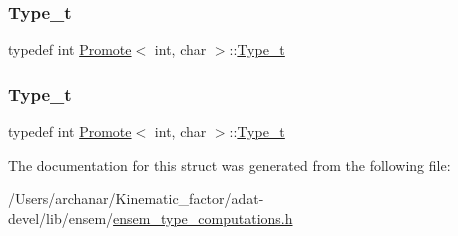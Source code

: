 \subsubsection{\texorpdfstring{Type\_t}{Type\_t}\hspace{0.1cm}{\footnotesize\ttfamily [2/3]}}
{\footnotesize\ttfamily typedef int \mbox{\hyperlink{structPromote}{Promote}}$<$ int, char $>$\+::\mbox{\hyperlink{structPromote_3_01int_00_01char_01_4_a0e318e07696fbce55dd03513e6452a2c}{Type\+\_\+t}}}

\mbox{\label{structPromote_3_01int_00_01char_01_4_a0e318e07696fbce55dd03513e6452a2c}} 
\subsubsection{\texorpdfstring{Type\_t}{Type\_t}\hspace{0.1cm}{\footnotesize\ttfamily [3/3]}}
{\footnotesize\ttfamily typedef int \mbox{\hyperlink{structPromote}{Promote}}$<$ int, char $>$\+::\mbox{\hyperlink{structPromote_3_01int_00_01char_01_4_a0e318e07696fbce55dd03513e6452a2c}{Type\+\_\+t}}}



The documentation for this struct was generated from the following file\+:\begin{DoxyCompactItemize}
\item 
/\+Users/archanar/\+Kinematic\+\_\+factor/adat-\/devel/lib/ensem/\mbox{\hyperlink{adat-devel_2lib_2ensem_2ensem__type__computations_8h}{ensem\+\_\+type\+\_\+computations.\+h}}\end{DoxyCompactItemize}
